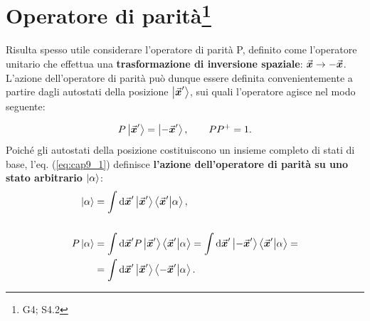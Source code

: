 \chapter[Operatore di parità]{Operatore di parità\footnote{G4; S4.2}}
Risulta spesso utile considerare l'operatore di parità P, definito come l'operatore unitario che effettua una \textbf{trasformazione di inversione spaziale}: $\va*{x}\to-\va*{x}$. L'azione dell'operatore di parità può dunque essere definita convenientemente a partire dagli autostati della posizione $\ket{\va*{x}'}$, sui quali l'operatore agisce nel modo seguente:

\begin{equation}
  \label{eq:cap9_1}
P\ket{\va*{x}'} = \ket{-\va*{x}'} , \qquad PP^+ = 1.
\end{equation}
Poiché gli autostati della posizione costituiscono un insieme completo di stati di base, l'eq. (\ref{eq:cap9_1}) definisce \textbf{l'azione dell'operatore di parità su uno stato arbitrario $\ket{\alpha}$}:
\begin{align}
  \ket{\alpha} &= \int\dd\va*{x}' \ket{\va*{x}'}\braket{\va*{x}'}{\alpha},\\
  \nonumber \\
  P\ket{\alpha} &= \int\dd\va*{x}' P\ket{\va*{x}'}\braket{\va*{x}'}{\alpha} = \int\dd\va*{x}' \ket{-\va*{x}'}\braket{\va*{x}'}{\alpha} =\nonumber\\
  &= \int\dd\va*{x}' \ket{\va*{x}'}\braket{-\va*{x}'}{\alpha} .
\end{align}

